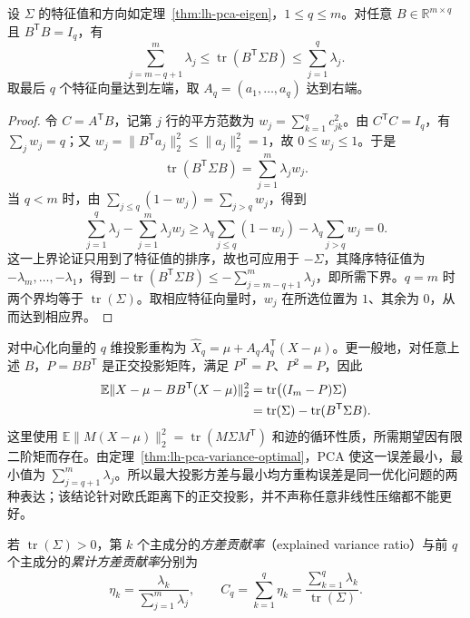 \begin{theorem}[给定维数下的方差最优化]
\label{thm:lh-pca-variance-optimal}
设 $\Sigma$ 的特征值和方向如定理~\ref{thm:lh-pca-eigen}，$1\leq q\leq m$。对任意 $B\in\mathbb R^{m\times q}$ 且 $B^{\mathsf T}B=I_q$，有
\begin{equation}
\sum_{j=m-q+1}^m\lambda_j
\leq\operatorname{tr}(B^{\mathsf T}\Sigma B)
\leq\sum_{j=1}^q\lambda_j.
\label{eq:lh-pca-variance-bounds}
\end{equation}
取最后 $q$ 个特征向量达到左端，取 $A_q=(a_1,\ldots,a_q)$ 达到右端。
\end{theorem}
\begin{proof}
令 $C=A^{\mathsf T}B$，记第 $j$ 行的平方范数为 $w_j=\sum_{k=1}^q c_{jk}^2$。由 $C^{\mathsf T}C=I_q$，有 $\sum_jw_j=q$；又 $w_j=\|B^{\mathsf T}a_j\|_2^2\leq\|a_j\|_2^2=1$，故 $0\leq w_j\leq1$。于是
\[
\operatorname{tr}(B^{\mathsf T}\Sigma B)=\sum_{j=1}^m\lambda_jw_j.
\]
当 $q<m$ 时，由 $\sum_{j\leq q}(1-w_j)=\sum_{j>q}w_j$，得到
\[
\sum_{j=1}^q\lambda_j-\sum_{j=1}^m\lambda_jw_j
\geq\lambda_q\sum_{j\leq q}(1-w_j)
-\lambda_q\sum_{j>q}w_j=0.
\]
这一上界论证只用到了特征值的排序，故也可应用于 $-\Sigma$，其降序特征值为 $-\lambda_m,\ldots,-\lambda_1$，得到 $-\operatorname{tr}(B^{\mathsf T}\Sigma B)\leq-\sum_{j=m-q+1}^m\lambda_j$，即所需下界。$q=m$ 时两个界均等于 $\operatorname{tr}(\Sigma)$。取相应特征向量时，$w_j$ 在所选位置为 $1$、其余为 $0$，从而达到相应界。
\end{proof}

对中心化向量的 $q$ 维投影重构为 $\widehat X_q=\mu+A_qA_q^{\mathsf T}(X-\mu)$。更一般地，对任意上述 $B$，$P=BB^{\mathsf T}$ 是正交投影矩阵，满足 $P^{\mathsf T}=P$、$P^2=P$，因此
\begin{align}
\mathbb E\|X-\mu-BB^{\mathsf T}(X-\mu)\|_2^2
&=\operatorname{tr}\bigl((I_m-P)\Sigma\bigr)\notag\\
&=\operatorname{tr}(\Sigma)-\operatorname{tr}(B^{\mathsf T}\Sigma B).
\label{eq:lh-pca-population-reconstruction}
\end{align}
这里使用 $\mathbb E\|M(X-\mu)\|_2^2=\operatorname{tr}(M\Sigma M^{\mathsf T})$ 和迹的循环性质，所需期望因有限二阶矩而存在。由定理~\ref{thm:lh-pca-variance-optimal}，PCA 使这一误差最小，最小值为 $\sum_{j=q+1}^m\lambda_j$。所以最大投影方差与最小均方重构误差是同一优化问题的两种表达；该结论针对欧氏距离下的正交投影，并不声称任意非线性压缩都不能更好。

\begin{definition}[方差贡献率与累计方差贡献率]
\label{def:lh-pca-explained-variance}
若 $\operatorname{tr}(\Sigma)>0$，第 $k$ 个主成分的\emph{方差贡献率}（explained variance ratio）与前 $q$ 个主成分的\emph{累计方差贡献率}分别为
\begin{equation}
\eta_k=\frac{\lambda_k}{\sum_{j=1}^m\lambda_j},\qquad
C_q=\sum_{k=1}^q\eta_k
=\frac{\sum_{k=1}^q\lambda_k}{\operatorname{tr}(\Sigma)}.
\label{eq:lh-pca-explained-variance}
\end{equation}
\end{definition}

